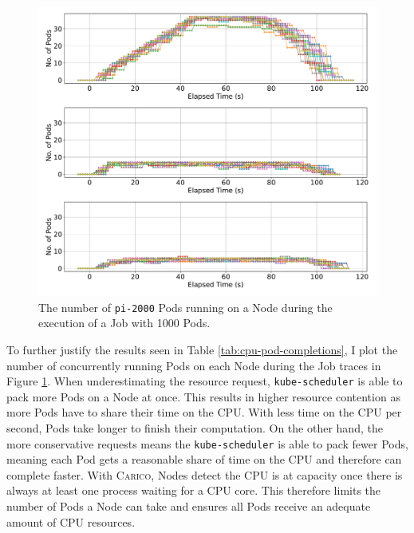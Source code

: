 \begin{figure}[ht!]
    \centering
    \includegraphics[width=\textwidth]{images/pi-running-pods.pdf}
    \caption{The number of \texttt{pi-2000} Pods running on a Node during the
    execution of a Job with 1000 Pods.}
    \label{fig:pi-2000-1000x-pod-running}
\end{figure}

To further justify the results seen in Table \ref{tab:cpu-pod-completions}, I
plot the number of concurrently running Pods on each Node during the Job traces
in Figure \ref{fig:pi-2000-1000x-pod-running}. When underestimating the resource
request, \texttt{kube-scheduler} is able to pack more Pods on a Node at once.
This results in higher resource contention as more Pods have to share their time
on the CPU. With less time on the CPU per second, Pods take longer to finish
their computation. On the other hand, the more conservative requests means the
\texttt{kube-scheduler} is able to pack fewer Pods, meaning each Pod gets a
reasonable share of time on the CPU and therefore can complete faster. With
\textsc{Carico}, Nodes detect the CPU is at capacity once there is always at
least one process waiting for a CPU core. This therefore limits the number of
Pods a Node can take and ensures all Pods receive an adequate amount of CPU
resources.

